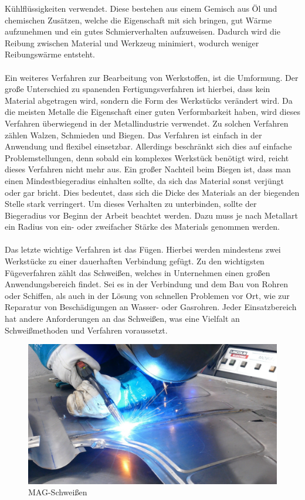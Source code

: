 Kühlflüssigkeiten verwendet. Diese bestehen aus einem Gemisch aus Öl und chemischen Zusätzen, welche die Eigenschaft mit sich bringen, gut Wärme 
aufzunehmen und ein gutes Schmierverhalten aufzuweisen. Dadurch wird die Reibung zwischen Material und Werkzeug minimiert, wodurch weniger Reibungswärme
entsteht. \autocite{Dietrich.2020} 
\\\\
Ein weiteres Verfahren zur Bearbeitung von Werkstoffen, ist die Umformung. Der große Unterschied zu spanenden Fertigungsverfahren ist hierbei, dass kein 
Material abgetragen wird, sondern die Form des Werkstücks verändert wird. Da die meisten Metalle die Eigenschaft einer guten Verformbarkeit haben, wird 
dieses Verfahren überwiegend in der Metallindustrie verwendet. Zu solchen Verfahren zählen \zB Walzen, Schmieden und Biegen. Das Verfahren ist einfach in der Anwendung und 
flexibel einsetzbar. Allerdings beschränkt sich dies auf einfache Problemstellungen, denn sobald ein komplexes Werkstück benötigt wird, reicht 
dieses Verfahren nicht mehr aus. Ein großer Nachteil beim Biegen ist, dass man einen Mindestbiegeradius einhalten sollte, da sich das Material sonst verjüngt 
oder gar bricht. Dies bedeutet, dass sich die Dicke des Materials an der biegenden Stelle stark verringert. 
Um dieses Verhalten zu unterbinden, sollte der Biegeradius vor Beginn der Arbeit beachtet werden. Dazu muss je nach Metallart ein Radius von ein- oder zweifacher
Stärke des Materials genommen werden. \autocite{Arendes.2023}
\\\\
Das letzte wichtige Verfahren ist das Fügen. Hierbei werden mindestens zwei Werkstücke zu einer dauerhaften Verbindung gefügt. Zu den wichtigsten 
Fügeverfahren zählt das Schweißen, welches in Unternehmen einen großen Anwendungsbereich findet. Sei es in der Verbindung und dem Bau von Rohren oder 
Schiffen, als auch in der Lösung von schnellen Problemen vor Ort, wie \zB zur Reparatur von Beschädigungen an Wasser- oder Gasrohren. Jeder Einsatzbereich 
hat andere Anforderungen an das Schweißen, was eine Vielfalt an Schweißmethoden und Verfahren voraussetzt. 
\begin{figure}[hbt]
    \centering
    \includegraphics[width=0.98\linewidth]{images/MAG}
    \caption[MAG-Schweißen]{MAG-Schweißen \autocite{MAG}}
    \label{fig:MAG-Schweißen}
\end{figure}
